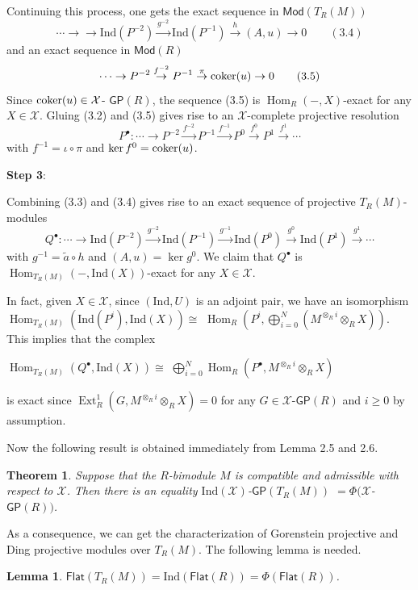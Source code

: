 \documentclass[10pt,twoside]{amsart}
\theoremstyle{bfupright head,slanted body}
\theoremstyle{bfupright head,upright body}
\theoremstyle{fixed bf head,slanted body}
\newtheorem{thm}[res]{Theorem}          \newtheorem*{thm*}{Theorem}
\newtheorem{lem}[res]{Lemma}            \newtheorem*{lem*}{Lemma}
\theoremstyle{fixed bf head,upright body}
\theoremstyle{numbered paragraph}
\newenvironment{prf*}[1][Proof]{%
  \begin{proof}[\bf #1]
    \setcounter{equation}{0}
    \renewcommand{\theequation}{\arabic{equation}}}
  {\end{proof}
  }
\numberwithin{equation}{res}
\newcommand{\GP}{\mathsf{GP}}
\newcommand{\Flat}{\mathsf{Flat}}
\newcommand{\Mod}{\mathsf{Mod}}
\newcommand{\Ind}{\mathrm{Ind}}
\newcommand{\cok}{\mbox{\rm coker}}
\newcommand{\Hom}{\operatorname{Hom}}
\newcommand{\Ext}{\operatorname{Ext}}
\begin{document}
\begin{prf*}
Continuing this process, one gets the exact sequence in $\Mod(T_R(M))$
$$\cdots \to \rightarrow \Ind(P^{-2})\overset{g^{-2}}\to\Ind(P^{-1})  \overset{h}\to  (A, u)\to 0 \qquad (3.4)$$
and an exact sequence in $\Mod(R)$ $$\cdots\to P^{-2}\overset{f^{-2}} \to P^{-1} \overset{\pi}\to \cok(u) \to 0 \qquad (3.5)$$ 
Since $\cok(u) \in\mathcal{X}$- $ \GP(R)$, the sequence (3.5) is $\Hom_{R}(-, X)$-exact for any $X\in\mathcal{X}$.
Gluing (3.2) and (3.5) gives rise to an $\mathcal{X}$-complete projective resolution 
$$P^{\bullet}: \cdots\to P^{-2}\overset{f^{-2}}\to P^{-1}\overset{f^{-1}}\to P^{0} \overset{f^{0}}\to P^{1} \overset{f^{1}}\to \cdots$$
with $f^{-1}= \iota\circ\pi$ and $\ker f^{0} =\cok (u)$.

\textbf{Step 3}:

Combining (3.3) and (3.4) gives rise to an exact sequence of projective $T_R(M)$-modules
$$Q^{\bullet}: \cdots\to\Ind(P^{-2})\overset{g^{-2}}\to \Ind(P^{-1})\overset{g^{-1}}\to \Ind(P^{0})\overset{g^{0}}\to \Ind(P^{1})\overset{g^{1}}\to \cdots$$
with $g^{-1}= \widetilde{a}\circ h$ and $(A, u) = \ker g^{0}$. 
We claim that $Q^{\bullet}$ is $\Hom_{T_R(M)}(-, \Ind(X))$-exact for any $X\in\mathcal{X}$.

In fact, given $X\in\mathcal{X}$, 
since $(\Ind, U)$ is an adjoint pair, we have an isomorphism
$\Hom_{T_R(M)}(\Ind (P^{i}), \Ind(X))\cong$ 
$\Hom_{R}(P^{i}, \bigoplus_{i=0}^N(M^{\otimes_Ri}\otimes_R X))$. 
This implies that the complex 
\begin{center}
$\Hom_{T_R(M)}(Q^{\bullet}, \Ind(X))\cong$ 
$\bigoplus_{i=0}^N\Hom_{R}(P^{\bullet}, M^{\otimes_Ri}\otimes_R X)$
\end{center}
is exact since $\Ext_{R}^{1}(G, M^{\otimes_Ri}\otimes_R X) =0$ 
for any $G\in\mathcal{X}$-$\GP(R)$ and $i\geqslant 0$ by assumption.
\end{prf*}

Now the following result is obtained immediately from Lemma 2.5 and 2.6.

\begin{thm}\label{THM GP com}
Suppose that the $R$-bimodule $M$ is compatible and admissible with respect to $\mathcal{X}$.
Then there is an equality
$\Ind(\mathcal{X})$-$\GP(T_R(M))$ $= \Phi(\mathcal{X}$-$\GP(R))$.
\end{thm}

As a consequence, we can get the characterization of Gorenstein projective and Ding projective modules over $T_R(M)$.
The following lemma is needed.

\begin{lem} \label{homological modules}
 $\Flat(T_R(M))=\Ind(\Flat(R))=\Phi(\Flat(R))$.
\end{lem}
\end{document}
